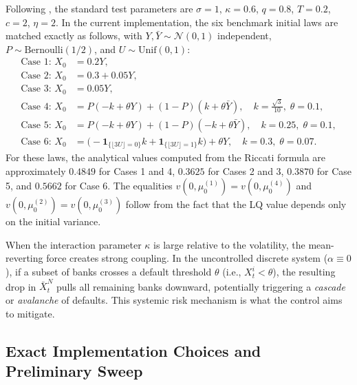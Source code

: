 \documentclass[11pt]{article}
\begin{document}
Following \citet{pham2024mfnn}, the standard test parameters are $\sigma = 1$, $\kappa = 0.6$, $q = 0.8$, $T = 0.2$, $c = 2$, $\eta = 2$. In the current implementation, the six benchmark initial laws are matched exactly as follows, with $Y, \bar Y \sim \mathcal{N}(0,1)$ independent, $P \sim \mathrm{Bernoulli}(1/2)$, and $U \sim \mathrm{Unif}(0,1)$:
\begin{align*}
  \text{Case 1: } X_0 &= 0.2Y, \\
  \text{Case 2: } X_0 &= 0.3 + 0.05Y, \\
  \text{Case 3: } X_0 &= 0.05Y, \\
  \text{Case 4: } X_0 &= P(-k + \theta Y) + (1-P)(k + \theta \bar Y), \quad k = \frac{\sqrt{3}}{10}, \; \theta = 0.1, \\
  \text{Case 5: } X_0 &= P(-k + \theta Y) + (1-P)(-k + \theta \bar Y), \quad k = 0.25, \; \theta = 0.1, \\
  \text{Case 6: } X_0 &= \big(-\mathbf{1}_{\{\lfloor 3U \rfloor = 0\}}k + \mathbf{1}_{\{\lfloor 3U \rfloor = 1\}}k\big) + \theta Y, \quad k = 0.3, \; \theta = 0.07.
\end{align*}
For these laws, the analytical values computed from the Riccati formula are approximately $0.4849$ for Cases 1 and 4, $0.3625$ for Cases 2 and 3, $0.3870$ for Case 5, and $0.5662$ for Case 6. The equalities $v(0,\mu_0^{(1)}) = v(0,\mu_0^{(4)})$ and $v(0,\mu_0^{(2)}) = v(0,\mu_0^{(3)})$ follow from the fact that the LQ value depends only on the initial variance.

\begin{remark}
  When the interaction parameter $\kappa$ is large relative to the volatility, the mean-reverting force creates strong coupling. In the uncontrolled discrete system ($\alpha \equiv 0$), if a subset of banks crosses a default threshold $\theta$ (i.e., $X_t^i < \theta$), the resulting drop in $\bar{X}_t^N$ pulls all remaining banks downward, potentially triggering a \emph{cascade} or \emph{avalanche} of defaults. This systemic risk mechanism is what the control aims to mitigate.
\end{remark}

\subsection{Exact Implementation Choices and Preliminary Sweep}
\end{document}
